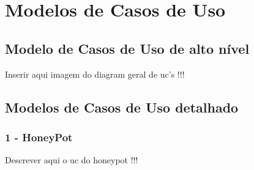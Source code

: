 \section{Modelos de Casos de Uso}
\subsection{Modelo de Casos de Uso de alto nível}

Inserir aqui imagem do diagram geral de uc's !!!

\subsection{Modelos de Casos de Uso detalhado}


\subsubsection{\textbf{1 - HoneyPot}}

Descrever aqui o uc do honeypot !!!

